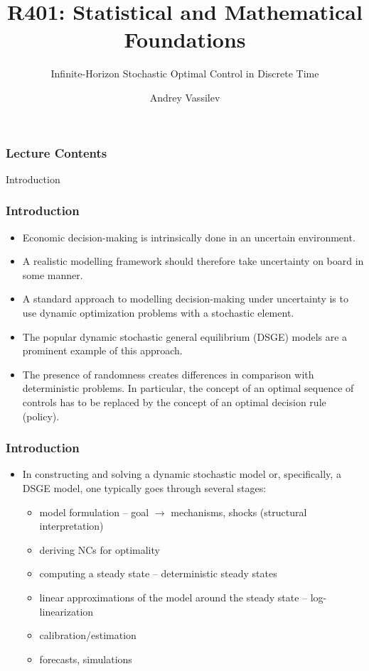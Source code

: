 \documentclass[10pt]{beamer}
\title{R401: Statistical and Mathematical Foundations \bigskip}
\subtitle{\textcolor{myred}{Infinite-Horizon Stochastic Optimal Control in Discrete Time}}
\author{Andrey Vassilev}
\date{}
\theoremstyle{definition}
\begin{document}
\maketitle



\begin{frame}[fragile]
\frametitle{Lecture Contents}
\tableofcontents
\end{frame}

\begin{section}{Introduction}\label{sec:intro}

\begin{frame}
\frametitle{Introduction}
\begin{itemize}\itemsep1em
\item Economic decision-making is intrinsically done in an uncertain environment.
\item A realistic modelling framework should therefore take uncertainty on board in some manner.
\item A standard approach to modelling decision-making under uncertainty is to use dynamic optimization problems with a stochastic element.
\item The popular dynamic stochastic general equilibrium (DSGE) models are a prominent example of this approach.
\item The presence of randomness creates differences in comparison with deterministic problems. In particular, the concept of an optimal sequence of controls has to be replaced by the concept of an optimal decision rule (policy).
\end{itemize}
\end{frame}


\begin{frame}
\frametitle{Introduction}
\begin{itemize}\itemsep1em
\item In constructing and solving a dynamic stochastic model or, specifically, a DSGE model, one typically goes through several stages:
\begin{itemize}\itemsep1em
  \item model formulation -- goal $\rightarrow$ mechanisms, shocks (structural interpretation)
  \item deriving NCs for optimality
  \item computing a steady state -- deterministic steady states 
  \item linear approximations of the model around the steady state -- log-linearization 
  \item calibration/estimation 
  \item forecasts, simulations
\end{itemize}
\end{itemize}
\end{frame}




\end{section}
\end{document}
